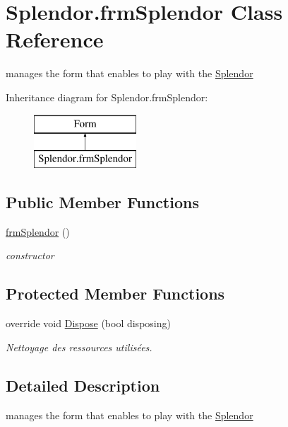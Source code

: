 \hypertarget{class_splendor_1_1frm_splendor}{}\section{Splendor.\+frm\+Splendor Class Reference}
\label{class_splendor_1_1frm_splendor}


manages the form that enables to play with the \hyperlink{namespace_splendor}{Splendor}  


Inheritance diagram for Splendor.\+frm\+Splendor\+:\begin{figure}[H]
\begin{center}
\leavevmode
\includegraphics[height=2.000000cm]{class_splendor_1_1frm_splendor}
\end{center}
\end{figure}
\subsection*{Public Member Functions}
\begin{DoxyCompactItemize}
\item 
\hyperlink{class_splendor_1_1frm_splendor_ad9c938893d23192acb1996053e3ea87b}{frm\+Splendor} ()
\begin{DoxyCompactList}\small\item\em constructor \end{DoxyCompactList}\end{DoxyCompactItemize}
\subsection*{Protected Member Functions}
\begin{DoxyCompactItemize}
\item 
override void \hyperlink{class_splendor_1_1frm_splendor_a749f4f1d67c78e74aa1a55aa6fdd754b}{Dispose} (bool disposing)
\begin{DoxyCompactList}\small\item\em Nettoyage des ressources utilisées. \end{DoxyCompactList}\end{DoxyCompactItemize}


\subsection{Detailed Description}
manages the form that enables to play with the \hyperlink{namespace_splendor}{Splendor} 



